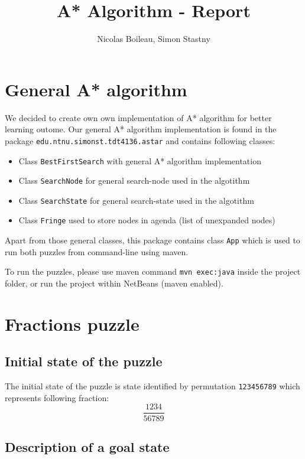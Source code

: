 \documentclass{article}
\begin{document}
\title{A* Algorithm - Report}
\author{Nicolas Boileau, Simon Stastny}

\maketitle

\section{General A* algorithm}

We decided to create own own implementation of A* algorithm for better learning
outome. Our general A* algorithm implementation is found in the package
\texttt{edu.ntnu.simonst.tdt4136.astar} and contains following classes:

\begin{itemize}
  \item Class \texttt{BestFirstSearch} with general A* algorithm implementation
  \item Class \texttt{SearchNode} for general search-node used in the algotithm
  \item Class \texttt{SearchState} for general search-state used in the
  algotithm
  \item Class \texttt{Fringe} used to store nodes in agenda (list of unexpanded
  nodes)
\end{itemize} 

Apart from those general classes, this package contains class \texttt{App} which
is used to run both puzzles from command-line using maven.

To run the puzzles, please use maven command \texttt{mvn exec:java} inside the
project folder, or run the project within NetBeans (maven enabled).

\section{Fractions puzzle}

\subsection{Initial state of the puzzle}

The initial state of the puzzle is state identified by permutation
\texttt{123456789} which represents following fraction:
\[
 \frac{1234}{56789}
\]

\subsection{Description of a goal state}
\end{document}
